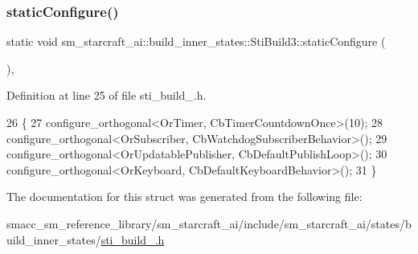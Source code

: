 \subsubsection{\texorpdfstring{static\+Configure()}{staticConfigure()}}
{\footnotesize\ttfamily static void sm\+\_\+starcraft\+\_\+ai\+::build\+\_\+inner\+\_\+states\+::\+Sti\+Build3\+::static\+Configure (\begin{DoxyParamCaption}{ }\end{DoxyParamCaption})\hspace{0.3cm}{\ttfamily [inline]}, {\ttfamily [static]}}



Definition at line 25 of file sti\+\_\+build\+\_.\+h.


\begin{DoxyCode}
26   \{
27     configure\_orthogonal<OrTimer, CbTimerCountdownOnce>(10);
28     configure\_orthogonal<OrSubscriber, CbWatchdogSubscriberBehavior>();
29     configure\_orthogonal<OrUpdatablePublisher, CbDefaultPublishLoop>();
30     configure\_orthogonal<OrKeyboard, CbDefaultKeyboardBehavior>();
31   \}
\end{DoxyCode}


The documentation for this struct was generated from the following file\+:\begin{DoxyCompactItemize}
\item 
smacc\+\_\+sm\+\_\+reference\+\_\+library/sm\+\_\+starcraft\+\_\+ai/include/sm\+\_\+starcraft\+\_\+ai/states/build\+\_\+inner\+\_\+states/\hyperlink{sti__build__3_8h}{sti\+\_\+build\+\_.\+h}\end{DoxyCompactItemize}
